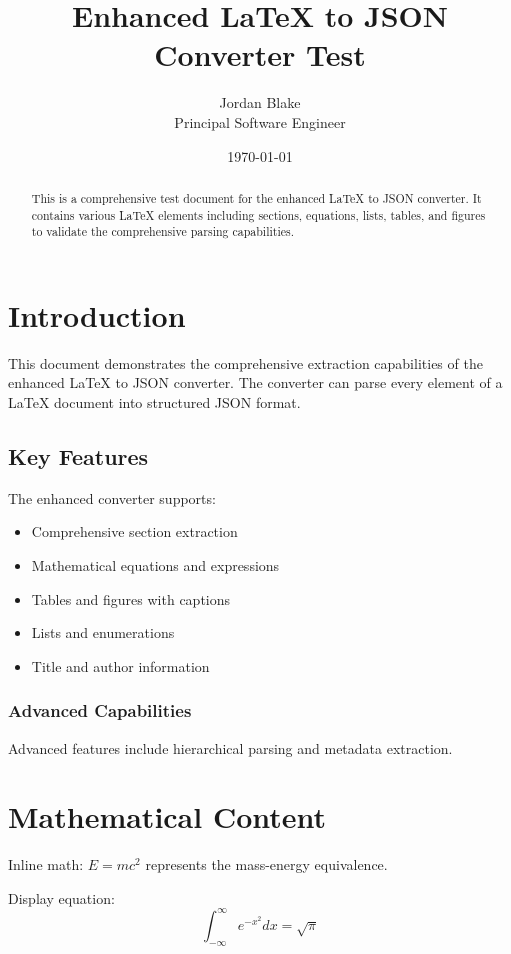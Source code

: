 \documentclass{article}
\title{Enhanced LaTeX to JSON Converter Test}
\author{Jordan Blake \\ Principal Software Engineer}
\date{\today}
\begin{document}
\maketitle
\tableofcontents

\begin{abstract}
This is a comprehensive test document for the enhanced LaTeX to JSON converter. 
It contains various LaTeX elements including sections, equations, lists, tables, 
and figures to validate the comprehensive parsing capabilities.
\end{abstract}

\section{Introduction}
This document demonstrates the comprehensive extraction capabilities of the 
enhanced LaTeX to JSON converter. The converter can parse every element 
of a LaTeX document into structured JSON format.

\subsection{Key Features}
The enhanced converter supports:
\begin{itemize}
\item Comprehensive section extraction
\item Mathematical equations and expressions
\item Tables and figures with captions
\item Lists and enumerations
\item Title and author information
\end{itemize}

\subsubsection{Advanced Capabilities}
Advanced features include hierarchical parsing and metadata extraction.

\section{Mathematical Content}

Inline math: $E = mc^2$ represents the mass-energy equivalence.

Display equation:
\begin{equation}
\int_{-\infty}^{\infty} e^{-x^2} dx = \sqrt{\pi}
\end{equation}
\end{document}
